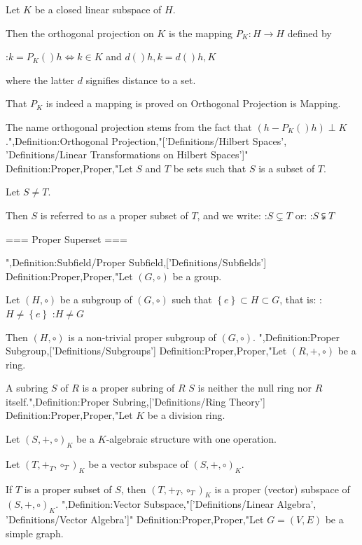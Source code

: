 Let $K$ be a closed linear subspace of $H$.


Then the orthogonal projection on $K$ is the mapping $P_K: H \to H$ defined by

:$k = P_K \left(   \right)h \iff k \in K$ and $d \left(   \right){h, k} = d \left(   \right){h, K}$

where the latter $d$ signifies distance to a set.


That $P_K$ is indeed a mapping is proved on Orthogonal Projection is Mapping.




The name orthogonal projection stems from the fact that $\left( h - P_K \left(   \right)h \right) \perp K$.",Definition:Orthogonal Projection,"['Definitions/Hilbert Spaces', 'Definitions/Linear Transformations on Hilbert Spaces']"
Definition:Proper,Proper,"Let $S$ and $T$ be sets such that $S$ is a subset of $T$.

Let $S \ne T$.

Then $S$ is referred to as a proper subset of $T$, and we write:
:$S \subsetneq T$
or:
:$S \subsetneqq T$


=== Proper Superset ===

",Definition:Subfield/Proper Subfield,['Definitions/Subfields']
Definition:Proper,Proper,"Let $\left( G, \circ \right)$ be a group.

Let $\left( H, \circ \right)$ be a subgroup of $\left( G, \circ \right)$ such that $\left\lbrace e \right\rbrace \subset H \subset G$, that is:
:$H \ne \left\lbrace e \right\rbrace$
:$H \ne G$

Then $\left( H, \circ \right)$ is a non-trivial proper subgroup of $\left( G, \circ \right)$.
",Definition:Proper Subgroup,['Definitions/Subgroups']
Definition:Proper,Proper,"Let $\left( R, +, \circ \right)$ be a ring.


A subring $S$ of $R$ is a proper subring of $R$  $S$ is neither the null ring nor $R$ itself.",Definition:Proper Subring,['Definitions/Ring Theory']
Definition:Proper,Proper,"Let $K$ be a division ring.

Let $\left( S, +, \circ \right)_K$ be a $K$-algebraic structure with one operation.

Let $\left( T, +_T, \circ_T \right)_K$ be a vector subspace of $\left( S, +, \circ \right)_K$.


If $T$ is a proper subset of $S$, then $\left( T, +_T, \circ_T \right)_K$ is a proper (vector) subspace of $\left( S, +, \circ \right)_K$.
",Definition:Vector Subspace,"['Definitions/Linear Algebra', 'Definitions/Vector Algebra']"
Definition:Proper,Proper,"Let $G = \left( V, E \right)$ be a simple graph.


